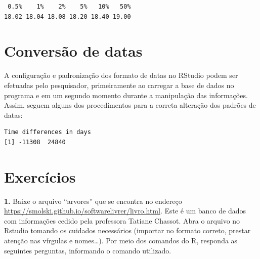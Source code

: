 \documentclass[12pt,brazil,oneside]{book}
\newenvironment{Shaded}{\begin{snugshade}}{\end{snugshade}}
\newcommand{\CommentTok}[1]{\textcolor[rgb]{0.56,0.35,0.01}{\textit{#1}}}
\newcommand{\DataTypeTok}[1]{\textcolor[rgb]{0.13,0.29,0.53}{#1}}
\newcommand{\KeywordTok}[1]{\textcolor[rgb]{0.13,0.29,0.53}{\textbf{#1}}}
\newcommand{\NormalTok}[1]{#1}
\newcommand{\OperatorTok}[1]{\textcolor[rgb]{0.81,0.36,0.00}{\textbf{#1}}}
\newcommand{\StringTok}[1]{\textcolor[rgb]{0.31,0.60,0.02}{#1}}
\begin{document}
\begin{verbatim}
 0.5%    1%    2%    5%   10%   50% 
18.02 18.04 18.08 18.20 18.40 19.00 
\end{verbatim}

\hypertarget{conversao-de-datas}{%
\section{Conversão de datas}\label{conversao-de-datas}}

A configuração e padronização dos formato de datas no RStudio podem ser efetuadas pelo pesquisador, primeiramente ao carregar a base de dados no programa e em um segundo momento durante a manipulação das informações. Assim, seguem alguns dos procedimentos para a correta alteração dos padrões de datas:

\begin{Shaded}
\end{Shaded}

\begin{verbatim}
Time differences in days
[1] -11308  24840
\end{verbatim}

\hypertarget{exercicios}{%
\section{Exercícios}\label{exercicios}}

\textbf{1.} Baixe o arquivo ``arvores'' que se encontra no endereço \url{https://smolski.github.io/softwarelivrer/livro.html}. Este é um banco de dados com informações cedido pela professora Tatiane Chassot. Abra o arquivo no Rstudio tomando os cuidados necessários (importar no formato correto, prestar atenção nas vírgulas e nomes\ldots{}). Por meio dos comandos do R, responda as seguintes perguntas, informando o comando utilizado.
\end{document}
